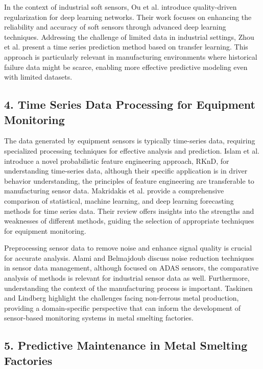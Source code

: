In the context of industrial soft sensors, Ou et al. \cite{ou-2022} introduce quality-driven regularization for deep learning networks. Their work focuses on enhancing the reliability and accuracy of soft sensors through advanced deep learning techniques.  Addressing the challenge of limited data in industrial settings, Zhou et al. \cite{zhou-2022} present a time series prediction method based on transfer learning. This approach is particularly relevant in manufacturing environments where historical failure data might be scarce, enabling more effective predictive modeling even with limited datasets.

\subsection*{4. Time Series Data Processing for Equipment Monitoring}

The data generated by equipment sensors is typically time-series data, requiring specialized processing techniques for effective analysis and prediction. Islam et al. \cite{islam-2024} introduce a novel probabilistic feature engineering approach, RKnD, for understanding time-series data, although their specific application is in driver behavior understanding, the principles of feature engineering are transferable to manufacturing sensor data.  Makridakis et al. \cite{makridakis-2022} provide a comprehensive comparison of statistical, machine learning, and deep learning forecasting methods for time series data. Their review offers insights into the strengths and weaknesses of different methods, guiding the selection of appropriate techniques for equipment monitoring.

Preprocessing sensor data to remove noise and enhance signal quality is crucial for accurate analysis. Alami and Belmajdoub \cite{alami-2024} discuss noise reduction techniques in sensor data management, although focused on ADAS sensors, the comparative analysis of methods is relevant for industrial sensor data as well.  Furthermore, understanding the context of the manufacturing process is important. Taskinen and Lindberg \cite{taskinen-2024} highlight the challenges facing non-ferrous metal production, providing a domain-specific perspective that can inform the development of sensor-based monitoring systems in metal smelting factories.

\subsection*{5. Predictive Maintenance in Metal Smelting Factories}

